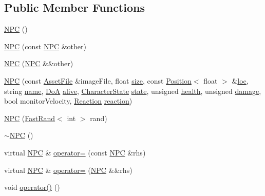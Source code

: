 \subsection*{Public Member Functions}
\begin{DoxyCompactItemize}
\item 
\hyperlink{class_n_p_c_a59b45912692304d555df9d6957046962}{N\-P\-C} ()
\item 
\hyperlink{class_n_p_c_a3416183550bea0c159cf154c41710fff}{N\-P\-C} (const \hyperlink{class_n_p_c}{N\-P\-C} \&other)
\item 
\hyperlink{class_n_p_c_a57565881c93d5b3839b8097ae16c38ae}{N\-P\-C} (\hyperlink{class_n_p_c}{N\-P\-C} \&\&other)
\item 
\hyperlink{class_n_p_c_a3afe2ba98d032697bdb09f9a08154614}{N\-P\-C} (const \hyperlink{struct_asset_file}{Asset\-File} \&image\-File, float \hyperlink{class_game_object_ac4637e122291be2421c851e2a87fb968}{size}, const \hyperlink{struct_position}{Position}$<$ float $>$ \&\hyperlink{class_game_object_a6858e668e7d2c5ded850b952aaacd905}{loc}, string \hyperlink{class_character_a2d423654566d1bf2160fef74bf04cc84}{name}, \hyperlink{_character_data_8h_acbff4d7298e294294555d39178aad448}{Do\-A} \hyperlink{class_character_ac83b99be690bb41b7fae53e9457838c6}{alive}, \hyperlink{_character_data_8h_aacbb008a93d24b04a8779bbdbd8880b5}{Character\-State} \hyperlink{class_character_ac20f1ebda238017ddc245ecdce827037}{state}, unsigned \hyperlink{class_character_ae8c0d82624dc3a171e2c3b42c699151e}{health}, unsigned \hyperlink{class_character_ae6a140637ffe5004179d90a0e04a411b}{damage}, bool monitor\-Velocity, \hyperlink{_character_data_8h_a0e5ce1612c1e71823c97a9cd734de339}{Reaction} \hyperlink{class_character_a579933775b2e4e97465bacb09c4e87f5}{reaction})
\item 
\hyperlink{class_n_p_c_a7b7d207fbbb2b27a1ca99cd7a533dce5}{N\-P\-C} (\hyperlink{class_fast_rand}{Fast\-Rand}$<$ int $>$ rand)
\item 
\hyperlink{class_n_p_c_a67c0caca129b56c82bb7ec8bce6be52b}{$\sim$\-N\-P\-C} ()
\item 
virtual \hyperlink{class_n_p_c}{N\-P\-C} \& \hyperlink{class_n_p_c_ae8d45c46413afc2d2ab08ff708c9d699}{operator=} (const \hyperlink{class_n_p_c}{N\-P\-C} \&rhs)
\item 
virtual \hyperlink{class_n_p_c}{N\-P\-C} \& \hyperlink{class_n_p_c_a19daaa71a87a22aa760db6ef639c3b53}{operator=} (\hyperlink{class_n_p_c}{N\-P\-C} \&\&rhs)
\item 
void \hyperlink{class_n_p_c_a73befe685fef40ab7f1ac954d932697d}{operator()} ()

\end{DoxyCompactItemize}
